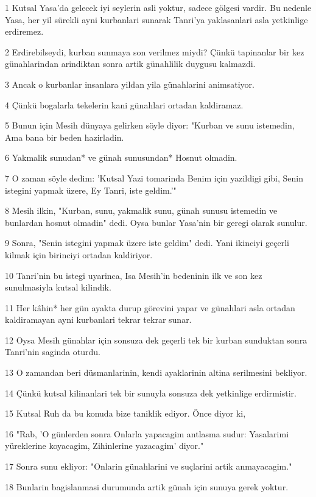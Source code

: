 \par 1 Kutsal Yasa'da gelecek iyi seylerin asli yoktur, sadece gölgesi vardir. Bu nedenle Yasa, her yil sürekli ayni kurbanlari sunarak Tanri'ya yaklasanlari asla yetkinlige erdiremez.
\par 2 Erdirebilseydi, kurban sunmaya son verilmez miydi? Çünkü tapinanlar bir kez günahlarindan arindiktan sonra artik günahlilik duygusu kalmazdi.
\par 3 Ancak o kurbanlar insanlara yildan yila günahlarini animsatiyor.
\par 4 Çünkü bogalarla tekelerin kani günahlari ortadan kaldiramaz.
\par 5 Bunun için Mesih dünyaya gelirken söyle diyor: "Kurban ve sunu istemedin, Ama bana bir beden hazirladin.
\par 6 Yakmalik sunudan* ve günah sunusundan* Hosnut olmadin.
\par 7 O zaman söyle dedim: 'Kutsal Yazi tomarinda Benim için yazildigi gibi, Senin istegini yapmak üzere, Ey Tanri, iste geldim.'"
\par 8 Mesih ilkin, "Kurban, sunu, yakmalik sunu, günah sunusu istemedin ve bunlardan hosnut olmadin" dedi. Oysa bunlar Yasa'nin bir geregi olarak sunulur.
\par 9 Sonra, "Senin istegini yapmak üzere iste geldim" dedi. Yani ikinciyi geçerli kilmak için birinciyi ortadan kaldiriyor.
\par 10 Tanri'nin bu istegi uyarinca, Isa Mesih'in bedeninin ilk ve son kez sunulmasiyla kutsal kilindik.
\par 11 Her kâhin* her gün ayakta durup görevini yapar ve günahlari asla ortadan kaldiramayan ayni kurbanlari tekrar tekrar sunar.
\par 12 Oysa Mesih günahlar için sonsuza dek geçerli tek bir kurban sunduktan sonra Tanri'nin saginda oturdu.
\par 13 O zamandan beri düsmanlarinin, kendi ayaklarinin altina serilmesini bekliyor.
\par 14 Çünkü kutsal kilinanlari tek bir sunuyla sonsuza dek yetkinlige erdirmistir.
\par 15 Kutsal Ruh da bu konuda bize taniklik ediyor. Önce diyor ki,
\par 16 "Rab, 'O günlerden sonra Onlarla yapacagim antlasma sudur: Yasalarimi yüreklerine koyacagim, Zihinlerine yazacagim' diyor."
\par 17 Sonra sunu ekliyor: "Onlarin günahlarini ve suçlarini artik anmayacagim."
\par 18 Bunlarin bagislanmasi durumunda artik günah için sunuya gerek yoktur.
